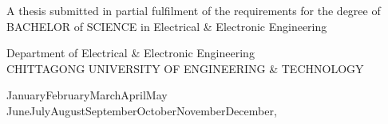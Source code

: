 \vspace{1cm}
\begin{center}
    A thesis submitted in partial fulfilment of the requirements for the degree of BACHELOR of SCIENCE in Electrical \& Electronic Engineering
\end{center}
\vspace{1cm}
\begin{center}
    Department of Electrical \& Electronic Engineering\\
    CHITTAGONG UNIVERSITY OF ENGINEERING \& TECHNOLOGY
\end{center}
\begin{center}
\renewcommand{\today}{\ifcase \month \or January\or February\or March\or   April\or May \or June\or July\or August\or September\or October\or November\or  December\fi, \number \year} 

\begin{center}
\large{\today}
\end{center}
\end{center}

\pagebreak{}
